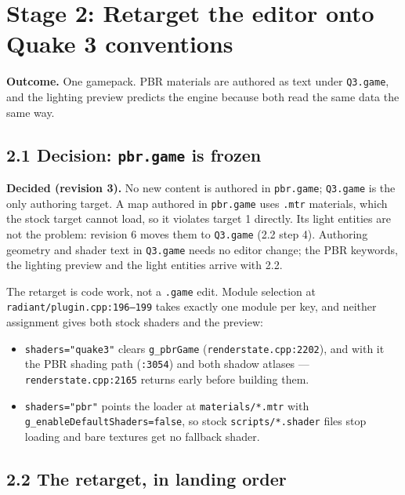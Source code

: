 \documentclass[11pt,a4paper]{article}
\begin{document}
\section{Stage 2: Retarget the editor onto Quake 3 conventions}

\textbf{Outcome.} One gamepack. PBR materials are authored as text under \texttt{Q3.game}, and the
lighting preview predicts the engine because both read the same data the same way.

\subsection{2.1 Decision: \texttt{pbr.game} is frozen}

\textbf{Decided (revision 3).} No new content is authored in \texttt{pbr.game}; \texttt{Q3.game} is
the only authoring target. A map authored in \texttt{pbr.game} uses \texttt{.mtr} materials, which
the stock target cannot load, so it violates target 1 directly. Its light entities are not the
problem: revision 6 moves them to \texttt{Q3.game} (2.2 step 4). Authoring geometry and shader text
in \texttt{Q3.game} needs no editor change; the PBR keywords, the lighting preview and the light
entities arrive with 2.2.

The retarget is code work, not a \texttt{.game} edit. Module selection at
\texttt{radiant/plugin.cpp:196--199} takes exactly one module per key, and neither assignment
gives both stock shaders and the preview:
\begin{itemize}
\item \texttt{shaders="quake3"} clears \texttt{g\_pbrGame} (\texttt{renderstate.cpp:2202}), and
  with it the PBR shading path (\texttt{:3054}) and both shadow atlases ---
  \texttt{renderstate.cpp:2165} returns early before building them.
\item \texttt{shaders="pbr"} points the loader at \texttt{materials/*.mtr} with
  \texttt{g\_enableDefaultShaders=false}, so stock \texttt{scripts/*.shader} files stop loading
  and bare textures get no fallback shader.
\end{itemize}

\subsection{2.2 The retarget, in landing order}
\end{document}
